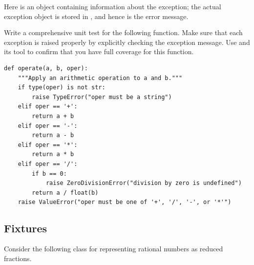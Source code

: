 Here  is an object containing information about the exception; the actual exception object is stored in , and hence  is the error message.

\begin{problem}
Write a comprehensive unit test for the following function.
Make sure that each exception is raised properly by explicitly checking the exception message.
Use  and its  tool to confirm that you have full coverage for this function.
\begin{lstlisting}
def operate(a, b, oper):
    """Apply an arithmetic operation to a and b."""
    if type(oper) is not str:
        raise TypeError("oper must be a string")
    elif oper == '+':
        return a + b
    elif oper == '-':
        return a - b
    elif oper == '*':
        return a * b
    elif oper == '/':
        if b == 0:
            raise ZeroDivisionError("division by zero is undefined")
        return a / float(b)
    raise ValueError("oper must be one of '+', '/', '-', or '*'")
\end{lstlisting}
\end{problem}

\subsection*{Fixtures} %

Consider the following class for representing rational numbers as reduced fractions.

